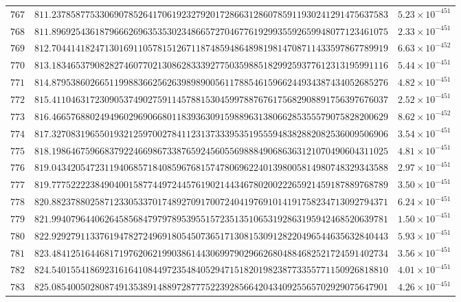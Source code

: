 \documentclass[12pt,reqno]{amsart}
\theoremstyle{remark}
\begin{document}
\begin{longtable}{clc}
$767$ & $811.2378587753306907852641706192327920172866312860785911930241291475637583$ & $5.23\times 10^{-451}$ \\
$768$ & $811.8969254361879666269635353023486657270467761929935592659948077123461075$ & $2.33\times 10^{-451}$ \\
$769$ & $812.7044141824713016911057815126711874859486489819814708711433597867789919$ & $6.63\times 10^{-452}$ \\
$770$ & $813.1834653790828274607702130862833392775035988518299259377612313195991116$ & $5.44\times 10^{-451}$ \\
$771$ & $814.8795386026651199883662562639898900561178854615966244934387434052685276$ & $4.82\times 10^{-451}$ \\
$772$ & $815.4110463172309053749027591145788153045997887676175682908891756397676037$ & $2.52\times 10^{-451}$ \\
$773$ & $816.4665768802494960296906680118393630915988963138066285355579075828200629$ & $8.62\times 10^{-452}$ \\
$774$ & $817.3270831965501932125970027841123137333953519555948382882082536009506906$ & $3.54\times 10^{-451}$ \\
$775$ & $818.1986467596683792246698673387659245605569888490686363121070490604311025$ & $4.81\times 10^{-451}$ \\
$776$ & $819.0434205472311940685718408596768157478069622401398005814980748329343588$ & $2.97\times 10^{-451}$ \\
$777$ & $819.7775222238490400158774497244576190214434678020022265921459187889768789$ & $3.50\times 10^{-451}$ \\
$778$ & $820.8823788025871233053370174892709170072404197691014191758234713092794371$ & $6.24\times 10^{-451}$ \\
$779$ & $821.9940796440626458568479797895395515723513510653192863195942468520639781$ & $1.50\times 10^{-451}$ \\
$780$ & $822.9292791133761947827249691805450736517130815309128220496544635632840443$ & $5.93\times 10^{-451}$ \\
$781$ & $823.4841251644681719762062199038614430699790296626804884682521724591402734$ & $3.56\times 10^{-451}$ \\
$782$ & $824.5401554186923161641084497235484052947151820198238773355771150926818810$ & $4.01\times 10^{-451}$ \\
$783$ & $825.0854005028087491353891488972877752239285664204340925565702929075647901$ & $4.26\times 10^{-451}$ \\

\end{longtable}
\end{document}
